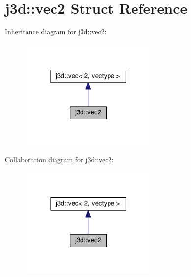 \hypertarget{structj3d_1_1vec2}{}\section{j3d\+:\+:vec2 Struct Reference}
\label{structj3d_1_1vec2}


Inheritance diagram for j3d\+:\+:vec2\+:
\nopagebreak
\begin{figure}[H]
\begin{center}
\leavevmode
\includegraphics[width=195pt]{structj3d_1_1vec2__inherit__graph}
\end{center}
\end{figure}


Collaboration diagram for j3d\+:\+:vec2\+:
\nopagebreak
\begin{figure}[H]
\begin{center}
\leavevmode
\includegraphics[width=195pt]{structj3d_1_1vec2__coll__graph}
\end{center}
\end{figure}

